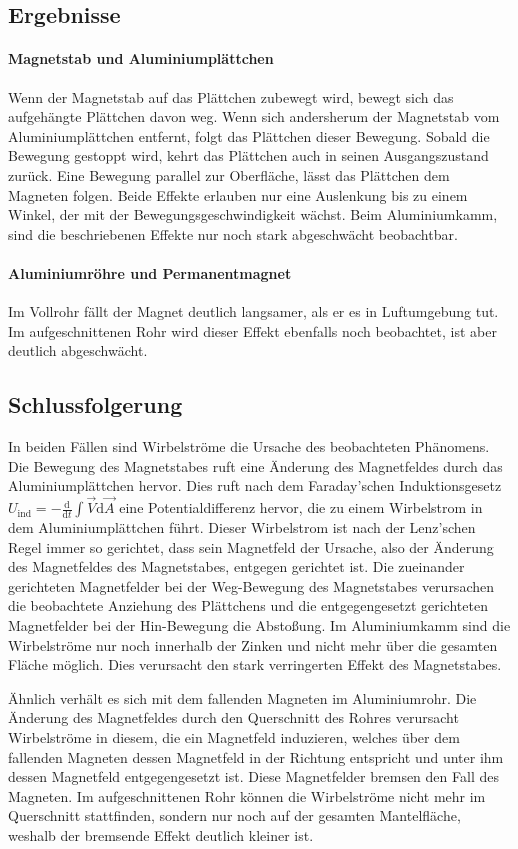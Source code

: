 \documentclass[
	a4paper,
	12pt,
	pagesize,
	ngerman
]{scrartcl}
\begin{document}
	\subsection{Ergebnisse}
	\paragraph{Magnetstab und Aluminiumplättchen}
	Wenn der Magnetstab auf das Plättchen zubewegt wird, bewegt sich das aufgehängte Plättchen davon weg. Wenn sich andersherum der Magnetstab vom Aluminiumplättchen entfernt, folgt das Plättchen dieser Bewegung. Sobald die Bewegung gestoppt wird, kehrt das Plättchen auch in seinen Ausgangszustand zurück. Eine Bewegung parallel zur Oberfläche, lässt das Plättchen dem Magneten folgen. Beide Effekte erlauben nur eine Auslenkung bis zu einem Winkel, der mit der Bewegungsgeschwindigkeit wächst. %
	Beim Aluminiumkamm, sind die beschriebenen Effekte nur noch stark abgeschwächt beobachtbar.
	\paragraph{Aluminiumröhre und Permanentmagnet}
	Im Vollrohr fällt der Magnet deutlich langsamer, als er es in Luftumgebung tut. Im aufgeschnittenen Rohr wird dieser Effekt ebenfalls noch beobachtet, ist aber deutlich abgeschwächt.
	\subsection{Schlussfolgerung}
	In beiden Fällen sind Wirbelströme die Ursache des beobachteten Phänomens.
	Die Bewegung des Magnetstabes ruft eine Änderung des Magnetfeldes durch das Aluminiumplättchen hervor. Dies ruft nach dem Faraday'schen Induktionsgesetz $U_\text{ind}= - \frac{\text{d}}{\text{d}t} \int \vec{V} \text{d} \vec{A}$ eine Potentialdifferenz hervor, die zu einem Wirbelstrom in dem Aluminiumplättchen führt. Dieser Wirbelstrom ist nach der Lenz'schen Regel immer so gerichtet, dass sein Magnetfeld der Ursache, also der Änderung des Magnetfeldes des Magnetstabes, entgegen gerichtet ist.%
	Die zueinander gerichteten Magnetfelder bei der Weg-Bewegung des Magnetstabes verursachen die beobachtete Anziehung des Plättchens und die entgegengesetzt gerichteten Magnetfelder bei der Hin-Bewegung die Abstoßung.
	Im Aluminiumkamm sind die Wirbelströme nur noch innerhalb der Zinken und nicht mehr über die gesamten Fläche möglich. Dies verursacht den stark verringerten Effekt des Magnetstabes. \par
	Ähnlich verhält es sich mit dem fallenden Magneten im Aluminiumrohr. Die Änderung des Magnetfeldes durch den Querschnitt des Rohres verursacht Wirbelströme in diesem, die ein Magnetfeld induzieren, welches über dem fallenden Magneten dessen Magnetfeld in der Richtung entspricht und unter ihm dessen Magnetfeld entgegengesetzt ist. Diese Magnetfelder bremsen den Fall des Magneten. Im aufgeschnittenen Rohr können die Wirbelströme nicht mehr im Querschnitt stattfinden, sondern nur noch auf der gesamten Mantelfläche, weshalb der bremsende Effekt deutlich kleiner ist. %
\end{document}
